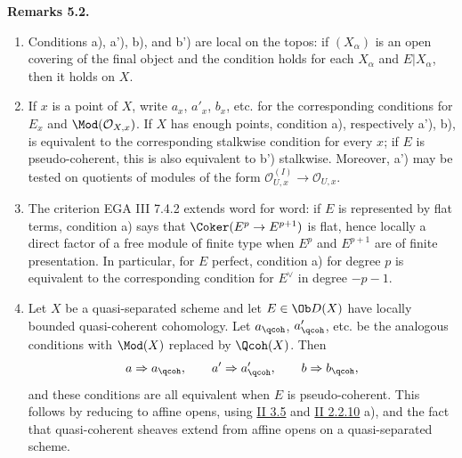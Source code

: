 \textbf{Remarks 5.2.}
\begin{enumerate}[label=\roman*)]
\item Conditions a), a'), b), and b') are local on the topos: if \((X_\alpha)\) is an open covering of the final object and the condition holds for each \(X_\alpha\) and \(E|X_\alpha\), then it holds on \(X\).
\item If \(x\) is a point of \(X\), write \(a_x\), \(a'_x\), \(b_x\), etc. for the corresponding conditions for \(E_x\) and \(\Mod(\mathcal O_{X,x})\). If \(X\) has enough points, condition a), respectively a'), b), is equivalent to the corresponding stalkwise condition for every \(x\); if \(E\) is pseudo-coherent, this is also equivalent to b') stalkwise. Moreover, a') may be tested on quotients of modules of the form \(\mathcal O_{U,x}^{(I)}\to\mathcal O_{U,x}\).
\item The criterion EGA III 7.4.2 extends word for word: if \(E\) is represented by flat terms, condition a) says that \(\Coker(E^p\to E^{p+1})\) is flat, hence locally a direct factor of a free module of finite type when \(E^p\) and \(E^{p+1}\) are of finite presentation. In particular, for \(E\) perfect, condition a) for degree \(p\) is equivalent to the corresponding condition for \(E^{\vee}\) in degree \(-p-1\).
\item Let \(X\) be a quasi-separated scheme and let \(E\in\Ob D(X)\) have locally bounded quasi-coherent cohomology. Let \(a_{\qcoh}\), \(a'_{\qcoh}\), etc. be the analogous conditions with \(\Mod(X)\) replaced by \(\Qcoh(X)\). Then
\[
 a\Rightarrow a_{\qcoh},\qquad
 a'\Rightarrow a'_{\qcoh},\qquad
 b\Rightarrow b_{\qcoh},
\]
and these conditions are all equivalent when \(E\) is pseudo-coherent. This follows by reducing to affine opens, using \hyperlink{sga6.e02.prop.3-5}{II 3.5} and \hyperlink{sga6.e02.rem.2-2-10}{II 2.2.10} a), and the fact that quasi-coherent sheaves extend from affine opens on a quasi-separated scheme.
\end{enumerate}

